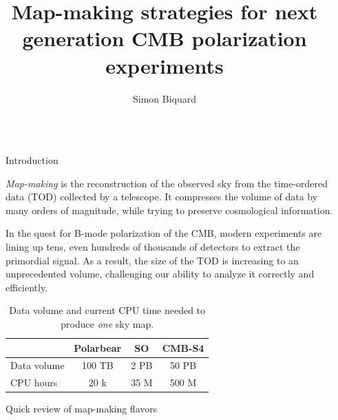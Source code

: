 \documentclass[final]{beamer}
\title{Map-making strategies for next generation CMB polarization experiments}
\author{Simon Biquard \inst{1}}
\institute[shortinst]{\inst{1} AstroParticule et Cosmologie, Paris, France}
\newlength{\sepwidth}
\newlength{\colwidth}
\newcommand{\separatorcolumn}{\begin{column}{\sepwidth}\end{column}}
\begin{document}

\begin{frame}[t]
  \begin{columns}[t]
    \separatorcolumn

    \begin{column}{\colwidth}

      \begin{block}{Introduction}

        \emph{Map-making} is the reconstruction of the observed sky from the time-ordered data (TOD) collected by a telescope.
        It compresses the volume of data by many orders of magnitude, while trying to preserve cosmological information.

        In the quest for B-mode polarization of the CMB, modern experiments are lining up tens, even hundreds of thousands of detectors to extract the primordial signal.
        As a result, the size of the TOD is increasing to an unprecedented volume, challenging our ability to analyze it correctly and efficiently.

        \begin{table}
          \centering
          \begin{tabular}{l c c c}
            \toprule
            \text{}     & \textbf{Polarbear} & \textbf{SO} & \textbf{CMB-S4} \\
            \midrule
            Data volume & 100 TB             & 2 PB        & 50 PB           \\
            CPU hours   & 20 k               & 35 M        & 500 M           \\
            \bottomrule
          \end{tabular}
          \caption{Data volume and current CPU time needed to produce \emph{one} sky map.}
        \end{table}

      \end{block}

      \begin{alertblock}{Quick review of map-making flavors}


\end{alertblock}
\end{column}
\end{columns}
\end{frame}
\end{document}
